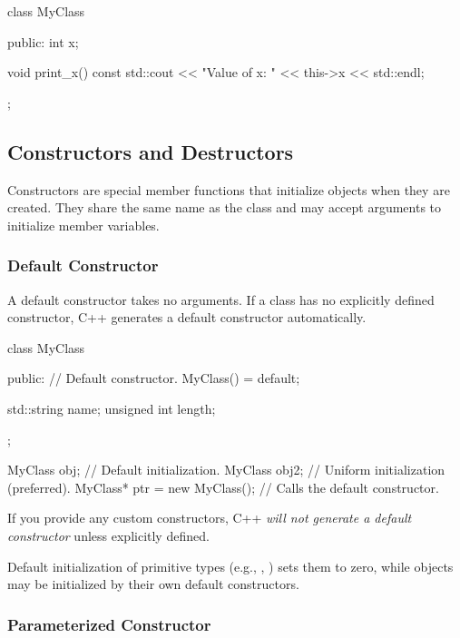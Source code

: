 \begin{codeblock}[language=C++]
class MyClass {
public:
    int x;

    void print_x() const {
        std::cout << "Value of x: " << this->x << std::endl;
    }
};
\end{codeblock}


\subsection{Constructors and Destructors}

Constructors are special member functions that initialize objects when they are created. They share the same name as the class and may accept arguments to initialize member variables.

\subsubsection{Default Constructor}

A default constructor takes no arguments. If a class has no explicitly defined constructor, C++ generates a default constructor automatically.

\begin{codeblock}[language=C++]
class MyClass {
public:
    // Default constructor.
    MyClass() = default;

    std::string name;
    unsigned int length;
};

MyClass obj;    // Default initialization.
MyClass obj2{}; // Uniform initialization (preferred).
MyClass* ptr = new MyClass(); // Calls the default constructor.
\end{codeblock}

\begin{observationblock}
If you provide any custom constructors, C++ \textit{will not generate a default constructor} unless explicitly defined.

Default initialization of primitive types (e.g., , ) sets them to zero, while objects may be initialized by their own default constructors.
\end{observationblock}

\vspace{-0.5em}

\subsubsection{Parameterized Constructor}


